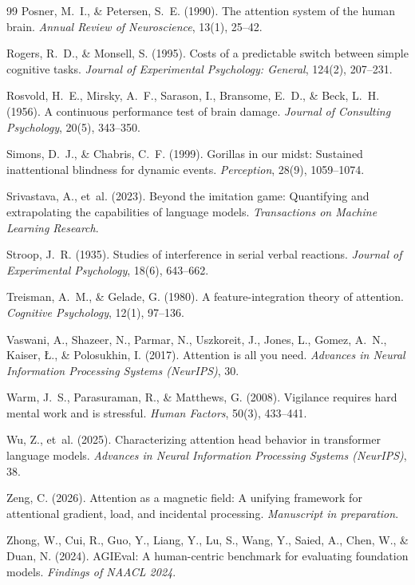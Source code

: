 \documentclass{article}
\begin{document}
\begin{thebibliography}{99}
Posner, M.~I., \& Petersen, S.~E. (1990). The attention system of the human brain. \emph{Annual Review of Neuroscience}, 13(1), 25--42.

Rogers, R.~D., \& Monsell, S. (1995). Costs of a predictable switch between simple cognitive tasks. \emph{Journal of Experimental Psychology: General}, 124(2), 207--231.

Rosvold, H.~E., Mirsky, A.~F., Sarason, I., Bransome, E.~D., \& Beck, L.~H. (1956). A continuous performance test of brain damage. \emph{Journal of Consulting Psychology}, 20(5), 343--350.

Simons, D.~J., \& Chabris, C.~F. (1999). Gorillas in our midst: Sustained inattentional blindness for dynamic events. \emph{Perception}, 28(9), 1059--1074.

Srivastava, A., et~al. (2023). Beyond the imitation game: Quantifying and extrapolating the capabilities of language models. \emph{Transactions on Machine Learning Research}.

Stroop, J.~R. (1935). Studies of interference in serial verbal reactions. \emph{Journal of Experimental Psychology}, 18(6), 643--662.

Treisman, A.~M., \& Gelade, G. (1980). A feature-integration theory of attention. \emph{Cognitive Psychology}, 12(1), 97--136.

Vaswani, A., Shazeer, N., Parmar, N., Uszkoreit, J., Jones, L., Gomez, A.~N., Kaiser, {\L}., \& Polosukhin, I. (2017). Attention is all you need. \emph{Advances in Neural Information Processing Systems (NeurIPS)}, 30.

Warm, J.~S., Parasuraman, R., \& Matthews, G. (2008). Vigilance requires hard mental work and is stressful. \emph{Human Factors}, 50(3), 433--441.

Wu, Z., et~al. (2025). Characterizing attention head behavior in transformer language models. \emph{Advances in Neural Information Processing Systems (NeurIPS)}, 38.

Zeng, C. (2026). Attention as a magnetic field: A unifying framework for attentional gradient, load, and incidental processing. \emph{Manuscript in preparation}.

Zhong, W., Cui, R., Guo, Y., Liang, Y., Lu, S., Wang, Y., Saied, A., Chen, W., \& Duan, N. (2024). AGIEval: A human-centric benchmark for evaluating foundation models. \emph{Findings of NAACL 2024}.

\end{thebibliography}
\end{document}

